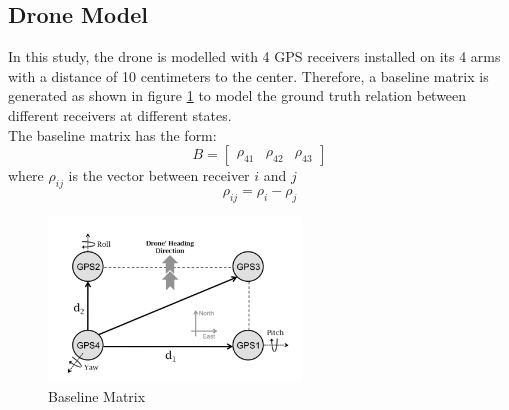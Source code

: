 \documentclass[journal,onecolumn]{IEEEtran}
\begin{document}
\subsection{Drone Model}
In this study, the drone is modelled with 4 GPS receivers installed on its 4 arms
with a distance of 10 centimeters to the center.
Therefore, a baseline matrix is generated as shown in figure \ref{drone} to
model the ground truth relation between different receivers at different states.\\
The baseline matrix has the form:
\begin{equation}
  B = \begin{bmatrix}\rho_{41}& \rho_{42}& \rho_{43}\end{bmatrix}
\end{equation}
where $\rho_{ij}$ is the vector between receiver $i$ and $j$
\begin{equation}
  \rho_{ij} = \rho_{i} - \rho_{j}
\end{equation}
\begin{figure}
  \centering
  \captionsetup{justification=centering}
  \includegraphics[width=0.6\textwidth]{fig/drone.png}
  \caption{Baseline Matrix}
  \label{drone}
\end{figure}
\end{document}
